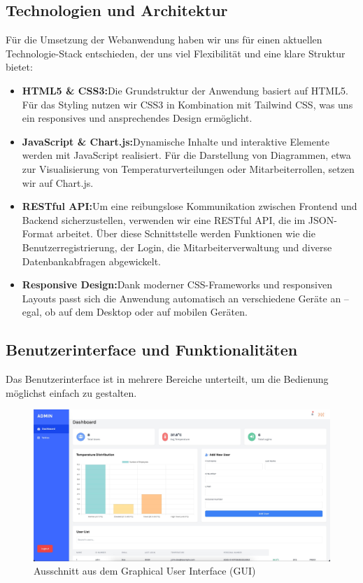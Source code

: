 \subsection{Technologien und Architektur}
\label{subsec:technologien_und_architektur}


Für die Umsetzung der Webanwendung haben wir uns für einen aktuellen Technologie-Stack entschieden, der uns viel Flexibilität und eine klare Struktur bietet:

\begin{itemize}
    \item \textbf{HTML5 \& CSS3:}\newline Die Grundstruktur der Anwendung basiert auf HTML5. Für das Styling nutzen wir CSS3 in Kombination mit Tailwind CSS, was uns ein responsives und ansprechendes Design ermöglicht.
    \item \textbf{JavaScript \& Chart.js:}\newline Dynamische Inhalte und interaktive Elemente werden mit JavaScript realisiert. Für die Darstellung von Diagrammen, etwa zur Visualisierung von Temperaturverteilungen oder Mitarbeiterrollen, setzen wir auf Chart.js.
    \item \textbf{RESTful API:}\newline Um eine reibungslose Kommunikation zwischen Frontend und Backend sicherzustellen, verwenden wir eine RESTful API, die im JSON-Format arbeitet. Über diese Schnittstelle werden Funktionen wie die Benutzerregistrierung, der Login, die Mitarbeiterverwaltung und diverse Datenbankabfragen abgewickelt.
    \item \textbf{Responsive Design:}\newline Dank moderner CSS-Frameworks und responsiven Layouts passt sich die Anwendung automatisch an verschiedene Geräte an – egal, ob auf dem Desktop oder auf mobilen Geräten.
\end{itemize}


\subsection{Benutzerinterface und Funktionalitäten}
\label{subsec:benutzerinterface_und_funktionalitäten}

Das Benutzerinterface ist in mehrere Bereiche unterteilt, um die Bedienung möglichst einfach zu gestalten. 

\begin{figure}[h]
	\centering
	\includegraphics[width=0.4\linewidth]{figures/GUI.jpeg}
	\caption[GUI]{Ausschnitt aus dem Graphical User Interface (GUI)}\label{fig:gui}
\end{figure}

